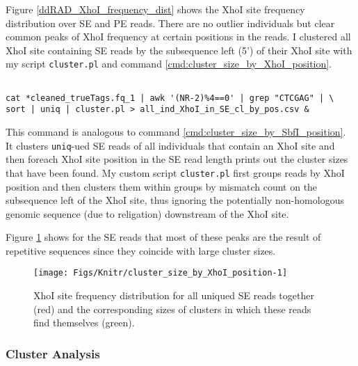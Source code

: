 \documentclass[a4paper,12pt,times,authoryear,twoside,print,index]{Classes/PhDThesisPSnPDF}\usepackage[]{graphicx}\usepackage[]{color}
\newenvironment{knitrout}{}{} %
\begin{document}
Figure \ref{ddRAD_XhoI_frequency_dist} shows the XhoI site frequency distribution over SE and PE reads. There are no outlier individuals but clear common peaks of XhoI frequency at certain positions in the reads. I clustered all XhoI site containing SE reads by the subsequence left (5') of their XhoI site with my script \texttt{cluster.pl} and command \ref{cmd:cluster_size_by_XhoI_position}. 
%
\begin{cmd}
\captionsetup{type=cmd}
\begin{Verbatim}[fontsize=\scriptsize, formatcom=\color{darkgray}]

cat *cleaned_trueTags.fq_1 | awk '(NR-2)%4==0' | grep "CTCGAG" | \
sort | uniq | cluster.pl > all_ind_XhoI_in_SE_cl_by_pos.csv & 
\end{Verbatim}
\caption{\small This command is analogous to command \ref{cmd:cluster_size_by_SbfI_position}. It clusters \texttt{uniq}-ued SE reads of all individuals that contain an XhoI site and then foreach XhoI site position in the SE read length prints out the cluster sizes that have been found. My custom script \texttt{cluster.pl} first groups reads by XhoI position and then clusters them within groups by mismatch count on the subsequence left of the XhoI site, thus ignoring the potentially non-homologous genomic sequence (due to religation) downstream of the XhoI site.}
\label{cmd:cluster_size_by_XhoI_position}
\end{cmd}
%
Figure \ref{cluster_size_by_XhoI_position} shows for the SE reads that most of these peaks are the result of repetitive sequences since they coincide with large cluster sizes. 
%
\begin{figure}
\begin{knitrout}
\color{fgcolor}

{\centering \texttt{[image: Figs/Knitr/cluster\_size\_by\_XhoI\_position-1]} 

}



\end{knitrout}
\caption{XhoI site frequency distribution for all uniqued SE reads together (red) and the corresponding sizes of clusters in which these reads find themselves (green).}
\label{cluster_size_by_XhoI_position}
\end{figure}
%



\subsubsection{Cluster Analysis}\label{cluster_analysis}
\end{document}
